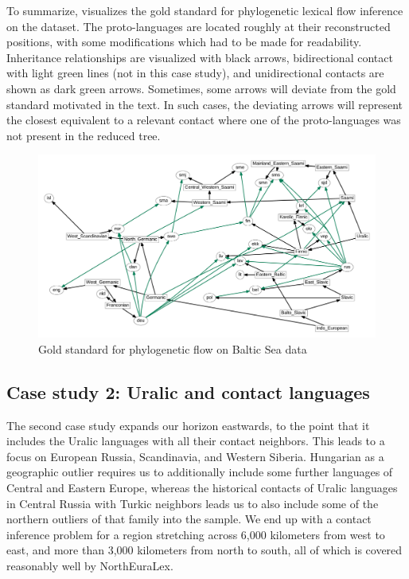 To summarize,  visualizes the gold standard for phylogenetic lexical flow inference on the dataset. The proto-languages are located roughly at their reconstructed positions, with some modifications which had to be made for readability. Inheritance relationships are visualized with black arrows, bidirectional contact with light green lines (not in this case study), and unidirectional contacts are shown as dark green arrows. Sometimes, some arrows will deviate from the gold standard motivated in the text. In such cases, the deviating arrows will represent the closest equivalent to a relevant contact where one of the proto-languages was not present in the reduced tree.

\begin{figure}
 \includegraphics[width=\textwidth]{figures/goldstandard-phylo-baltic.pdf}
 \caption{Gold standard for phylogenetic flow on Baltic Sea data}
 \label{baltic-goldstandard-phylo}
\end{figure}

\subsection{Case study 2: Uralic and contact languages}
The second case study expands our horizon eastwards, to the point that it includes the Uralic languages with all their contact neighbors. This leads to a focus on European Russia, Scandinavia, and Western Siberia. Hungarian as a geographic outlier requires us to additionally include some further languages of Central and Eastern Europe, whereas the historical contacts of Uralic languages in Central Russia with Turkic neighbors leads us to also include some of the northern outliers of that family into the sample. We end up with a contact inference problem for a region stretching across 6,000 kilometers from west to east, and more than 3,000 kilometers from north to south, all of which is covered reasonably well by NorthEuraLex.


